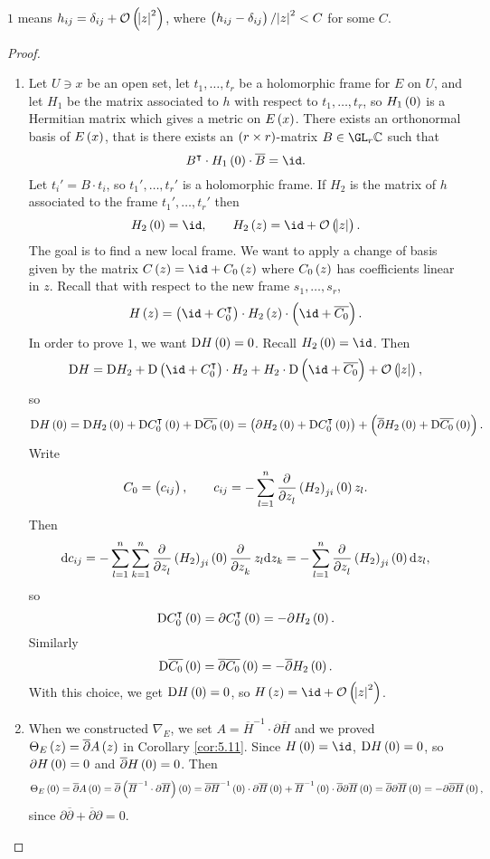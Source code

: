 $ 1 $ means $ h_{ij} = \delta_{ij} + \OOO\br{\abs{z}^2} $, where $ \br{h_{ij} - \delta_{ij}} / \abs{z}^2 < C $ for some $ C $.

\begin{proof}
\hfill
\begin{enumerate}
\item Let $ U \ni x $ be an open set, let $ t_1, \dots, t_r $ be a holomorphic frame for $ E $ on $ U $, and let $ H_1 $ be the matrix associated to $ h $ with respect to $ t_1, \dots, t_r $, so $ H_1\br{0} $ is a Hermitian matrix which gives a metric on $ E\br{x} $. There exists an orthonormal basis of $ E\br{x} $, that is there exists an $ \br{r \times r} $-matrix $ B \in \GL_r \CC $ such that
$$ B^\intercal \cdot H_1\br{0} \cdot \overline{B} = \id. $$
Let $ t_i' = B \cdot t_i $, so $ t_1', \dots, t_r' $ is a holomorphic frame. If $ H_2 $ is the matrix of $ h $ associated to the frame $ t_1', \dots, t_r' $ then
$$ H_2\br{0} = \id, \qquad H_2\br{z} = \id + \OOO\br{\abs{z}}. $$
The goal is to find a new local frame. We want to apply a change of basis given by the matrix $ C\br{z} = \id + C_0\br{z} $ where $ C_0\br{z} $ has coefficients linear in $ z $. Recall that with respect to the new frame $ s_1, \dots, s_r $,
$$ H\br{z} = \br{\id + C_0^\intercal} \cdot H_2\br{z} \cdot \br{\id + \overline{C_0}}. $$
In order to prove $ 1 $, we want $ \D H\br{0} = 0 $. Recall $ H_2\br{0} = \id $. Then
$$ \D H = \D H_2 + \D\br{\id + C_0^\intercal} \cdot H_2 + H_2 \cdot \D\br{\id + \overline{C_0}} + \OOO\br{\abs{z}}, $$
so
$$ \D H\br{0} = \D H_2\br{0} + \D C_0^\intercal\br{0} + \D\overline{C_0}\br{0} = \br{\partial H_2\br{0} + \D C_0^\intercal\br{0}} + \br{\overline{\partial}H_2\br{0} + \D\overline{C_0}\br{0}}. $$
Write
$$ C_0 = \br{c_{ij}}, \qquad c_{ij} = -\sum_{l = 1}^n \dpd{}{z_l}\br{H_2}_{ji}\br{0}z_l. $$
Then
$$ \d c_{ij} = -\sum_{l = 1}^n \sum_{k = 1}^n \dpd{}{z_l}\br{H_2}_{ji}\br{0}\dpd{}{z_k}z_l\d z_k = -\sum_{l = 1}^n \dpd{}{z_l}\br{H_2}_{ji}\br{0}\d z_l, $$
so
$$ \D C_0^\intercal\br{0} = \partial C_0^\intercal\br{0} = -\partial H_2\br{0}. $$
Similarly
$$ \D\overline{C_0}\br{0} = \overline{\partial}\overline{C_0}\br{0} = -\overline{\partial}H_2\br{0}. $$
With this choice, we get $ \D H\br{0} = 0 $, so $ H\br{z} = \id + \OOO\br{\abs{z}^2} $.


\item When we constructed $ \nabla_E $, we set $ A = \overline{H}^{-1} \cdot \partial\overline{H} $ and we proved $ \Theta_E\br{z} = \overline{\partial}A\br{z} $ in Corollary \ref{cor:5.11}. Since $ H\br{0} = \id $, $ \D H\br{0} = 0 $, so $ \partial H\br{0} = 0 $ and $ \overline{\partial}H\br{0} = 0 $. Then
$$ \Theta_E\br{0} = \overline{\partial}A\br{0} = \overline{\partial}\br{\overline{H}^{-1} \cdot \partial\overline{H}}\br{0} = \overline{\partial}\overline{H}^{-1}\br{0} \cdot \partial\overline{H}\br{0} + \overline{H}^{-1}\br{0} \cdot \overline{\partial}\partial\overline{H}\br{0} = \overline{\partial}\partial\overline{H}\br{0} = -\partial\overline{\partial}\overline{H}\br{0}, $$
since $ \partial\overline{\partial} + \overline{\partial}\partial = 0 $.
\end{enumerate}
\end{proof}

